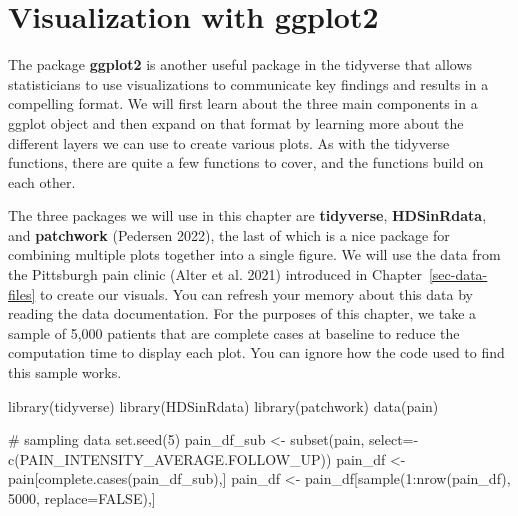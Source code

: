 \documentclass[
  letterpaper,
]{krantz}
\makeatletter
\newenvironment{Shaded}{\begin{snugshade}}{\end{snugshade}}
\newcommand{\AttributeTok}[1]{\textcolor[rgb]{0.40,0.45,0.13}{#1}}
\newcommand{\CommentTok}[1]{\textcolor[rgb]{0.37,0.37,0.37}{#1}}
\newcommand{\ConstantTok}[1]{\textcolor[rgb]{0.56,0.35,0.01}{#1}}
\newcommand{\DecValTok}[1]{\textcolor[rgb]{0.68,0.00,0.00}{#1}}
\newcommand{\FunctionTok}[1]{\textcolor[rgb]{0.28,0.35,0.67}{#1}}
\newcommand{\NormalTok}[1]{\textcolor[rgb]{0.00,0.23,0.31}{#1}}
\newcommand{\OtherTok}[1]{\textcolor[rgb]{0.00,0.23,0.31}{#1}}
\newcommand{\SpecialCharTok}[1]{\textcolor[rgb]{0.37,0.37,0.37}{#1}}
\newenvironment{kframe}{%
\medskip{}
\setlength{\fboxsep}{.8em}
 \def\at@end@of@kframe{}%
 \ifinner\ifhmode%
  \def\at@end@of@kframe{\end{minipage}}%
  \begin{minipage}{\columnwidth}%
 \fi\fi%
 \def\FrameCommand##1{\hskip\@totalleftmargin \hskip-\fboxsep
 \colorbox{shadecolor}{##1}\hskip-\fboxsep
     \hskip-\linewidth \hskip-\@totalleftmargin \hskip\columnwidth}%
 \MakeFramed {\advance\hsize-\width
   \@totalleftmargin\z@ \linewidth\hsize
   \@setminipage}}%
 {\par\unskip\endMakeFramed%
 \at@end@of@kframe}
\renewenvironment{Shaded}{\begin{kframe}}{\end{kframe}}
\makeatother
\begin{document}

\hypertarget{sec-ggplot2}{%
\chapter{Visualization with ggplot2}\label{sec-ggplot2}}

The package \textbf{ggplot2} is another useful package in the tidyverse
that allows statisticians to use visualizations to communicate key
findings and results in a compelling format. We will first learn about
the three main components in a ggplot object and then expand on that
format by learning more about the different layers we can use to create
various plots. As with the tidyverse functions, there are quite a few
functions to cover, and the functions build on each other.

The three packages we will use in this chapter are \textbf{tidyverse},
\textbf{HDSinRdata}, and \textbf{patchwork} (Pedersen 2022), the last of
which is a nice package for combining multiple plots together into a
single figure. We will use the data from the Pittsburgh pain clinic
(Alter et al. 2021) introduced in Chapter~\ref{sec-data-files} to create
our visuals. You can refresh your memory about this data by reading the
data documentation. For the purposes of this chapter, we take a sample
of 5,000 patients that are complete cases at baseline to reduce the
computation time to display each plot. You can ignore how the code used
to find this sample works.

\begin{Shaded}
\begin{Highlighting}[]
\FunctionTok{library}\NormalTok{(tidyverse)}
\FunctionTok{library}\NormalTok{(HDSinRdata)}
\FunctionTok{library}\NormalTok{(patchwork)}
\FunctionTok{data}\NormalTok{(pain)}

\CommentTok{\# sampling data}
\FunctionTok{set.seed}\NormalTok{(}\DecValTok{5}\NormalTok{)}
\NormalTok{pain\_df\_sub }\OtherTok{\textless{}{-}} \FunctionTok{subset}\NormalTok{(pain, }\AttributeTok{select=}\SpecialCharTok{{-}}\FunctionTok{c}\NormalTok{(PAIN\_INTENSITY\_AVERAGE.FOLLOW\_UP))}
\NormalTok{pain\_df }\OtherTok{\textless{}{-}}\NormalTok{ pain[}\FunctionTok{complete.cases}\NormalTok{(pain\_df\_sub),]}
\NormalTok{pain\_df }\OtherTok{\textless{}{-}}\NormalTok{ pain\_df[}\FunctionTok{sample}\NormalTok{(}\DecValTok{1}\SpecialCharTok{:}\FunctionTok{nrow}\NormalTok{(pain\_df), }\DecValTok{5000}\NormalTok{, }\AttributeTok{replace=}\ConstantTok{FALSE}\NormalTok{),] }
\end{Highlighting}
\end{Shaded}
\end{document}
